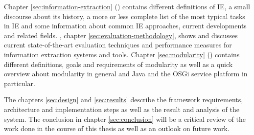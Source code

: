 Chapter \ref{sec:information-extraction} () contains different definitions of \gls{IE}, a small discourse about its history, a more or less complete list of the most typical tasks in \gls{IE} and some information about common \gls{IE} approaches, current developments and related fields. , chapter \ref{sec:evaluation-methodology}, shows and discusses current state-of-the-art evaluation techniques and performance measures for information extraction systems and tools. Chapter \ref{sec:modularity} () contains different definitions, goals and requirements of modularity as well as a quick overview about modularity in general and Java and the \gls{OSGi} service platform in particular.


The chapters \ref{sec:design}  and \ref{sec:results}  describe the framework requirements, architecture and implementation steps as well as the result and analysis of the system. The conclusion in chapter \ref{sec:conclusion} will be a critical review of the work done in the course of this thesis as well as an outlook on future work.